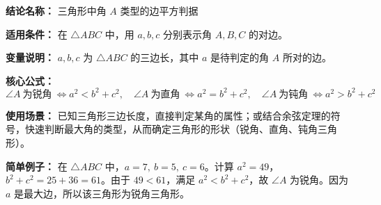\textbf{结论名称：} 三角形中角 \(A\) 类型的边平方判据

\textbf{适用条件：} 在 \(\triangle ABC\) 中，用 \(a,b,c\) 分别表示角 \(A,B,C\) 的对边。

\textbf{变量说明：} \(a,b,c\) 为 \(\triangle ABC\) 的三边长，其中 \(a\) 是待判定的角 \(A\) 所对的边。

\textbf{核心公式：}
\[
\boxed{
\angle A\ \text{为锐角}\ \iff a^2 < b^2 + c^2,\quad
\angle A\ \text{为直角}\ \iff a^2 = b^2 + c^2,\quad
\angle A\ \text{为钝角}\ \iff a^2 > b^2 + c^2
}
\]

\textbf{使用场景：} 已知三角形三边长度，直接判定某角的属性；或结合余弦定理的符号，快速判断最大角的类型，从而确定三角形的形状（锐角、直角、钝角三角形）。

\textbf{简单例子：} 在 \(\triangle ABC\) 中，\(a=7,\ b=5,\ c=6\)。计算 \(a^2=49\)，\(b^2+c^2=25+36=61\)。由于 \(49<61\)，满足 \(a^2 < b^2+c^2\)，故 \(\angle A\) 为锐角。因为 \(a\) 是最大边，所以该三角形为锐角三角形。